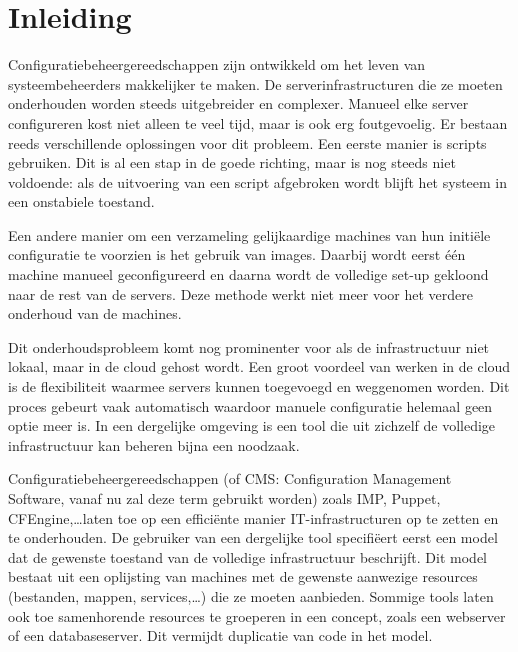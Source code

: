 \chapter{Inleiding}
\label{inleiding}
Configuratiebeheergereedschappen zijn ontwikkeld om het leven van systeembeheerders makkelijker te maken.
De serverinfrastructuren die ze moeten onderhouden worden steeds uitgebreider en complexer.
Manueel elke server configureren kost niet alleen te veel tijd, maar is ook erg foutgevoelig.
Er bestaan reeds verschillende oplossingen voor dit probleem.
Een eerste manier is scripts gebruiken.
Dit is al een stap in de goede richting, maar is nog steeds niet voldoende: 
als de uitvoering van een script afgebroken wordt blijft het systeem in een onstabiele toestand.\cite{sysadvent}

Een andere manier om een verzameling gelijkaardige machines van hun initi\"ele configuratie te voorzien is het gebruik van images.
Daarbij wordt eerst \'e\'en machine manueel geconfigureerd en daarna wordt de volledige set-up gekloond naar de rest van de servers.
Deze methode werkt niet meer voor het verdere onderhoud van de machines.

Dit onderhoudsprobleem komt nog prominenter voor als de infrastructuur niet lokaal, maar in de cloud gehost wordt.
Een groot voordeel van werken in de cloud is de flexibiliteit waarmee servers kunnen toegevoegd en weggenomen worden.
Dit proces gebeurt vaak automatisch waardoor manuele configuratie helemaal geen optie meer is. 
In een dergelijke omgeving is een tool die uit zichzelf de volledige infrastructuur kan beheren bijna een noodzaak.

Configuratiebeheergereedschappen (of CMS: Configuration Management Software, vanaf nu zal deze term gebruikt worden) zoals IMP\cite{IMP}, Puppet\cite{puppet}, CFEngine\cite{cfengine},\ldots laten toe op een effici\"ente manier IT-infrastructuren op te zetten en te onderhouden.
De gebruiker van een dergelijke tool specifi\"eert eerst een model dat de gewenste toestand van de volledige infrastructuur beschrijft.
Dit model bestaat uit een oplijsting van machines met de gewenste aanwezige resources (bestanden, mappen, services,\ldots) die ze moeten aanbieden.
Sommige tools laten ook toe samenhorende resources te groeperen in een concept, zoals een webserver of een databaseserver.
Dit vermijdt duplicatie van code in het model.

